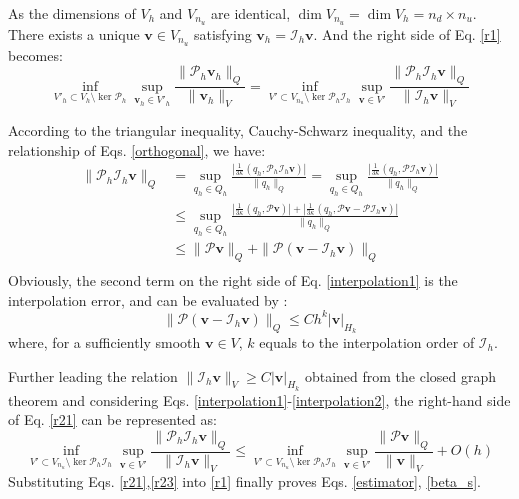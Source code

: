 \begin{pf}
As the dimensions of $V_h$ and $V_{n_u}$ are identical, $\dim V_{n_u} = \dim V_h = n_d \times n_u$. There exists a unique $\boldsymbol{v} \in V_{n_u}$ satisfying $\boldsymbol{v}_h = \mathcal{I}_h \boldsymbol{v}$. And the right side of Eq. \eqref{r1} becomes:
\begin{equation}\label{r21}
\inf_{V'_h \subset V_h \setminus \ker \mathcal{P}_h} \sup_{\boldsymbol{v}_h \in V'_h} \frac{\|\mathcal{P}_h \boldsymbol{v}_h\|_Q}{\|\boldsymbol{v}_h\|_V} = \inf_{V' \subset V_{n_u} \setminus \ker \mathcal{P}_h \mathcal{I}_h} \sup_{\boldsymbol{v} \in V'} \frac{\|\mathcal{P}_h \mathcal{I}_h \boldsymbol{v}\|_Q}{\|\mathcal{I}_h \boldsymbol{v}\|_V}
\end{equation}

According to the triangular inequality, Cauchy-Schwarz inequality, and the relationship of Eqs. \eqref{orthogonal}, we have:
\begin{equation}\label{interpolation1}
\begin{aligned}
\|\mathcal{P}_h \mathcal{I}_h \boldsymbol{v}\|_Q &= \sup_{q_h \in Q_h} \frac{|\frac{1}{3\kappa} (q_h, \mathcal{P}_h \mathcal{I}_h \boldsymbol{v})|}{\|q_h\|_Q} = \sup_{q_h \in Q_h} \frac{|\frac{1}{3\kappa}(q_h, \mathcal{P} \mathcal{I}_h \boldsymbol{v})|}{\|q_h\|_Q} \\
&\le \sup_{q_h \in Q_h} \frac{|\frac{1}{3\kappa}(q_h, \mathcal{P} \boldsymbol{v})| + |\frac{1}{3\kappa}(q_h, \mathcal{P} \boldsymbol{v} - \mathcal{P} \mathcal{I}_h \boldsymbol{v})|}{\|q_h\|_Q} \\
&\le \|\mathcal{P} \boldsymbol{v}\|_Q + \|\mathcal{P} (\boldsymbol{v} - \mathcal{I}_h \boldsymbol{v})\|_Q \\
\end{aligned}
\end{equation}
Obviously, the second term on the right side of Eq. \eqref{interpolation1} is the interpolation error, and can be evaluated by \cite{yosida1995}:
\begin{equation}
\label{interpolation2}
\|\mathcal{P} (\boldsymbol{v} - \mathcal{I}_h \boldsymbol{v})\|_Q \le Ch^{k} |\boldsymbol{v}|_{H_k}
\end{equation}
where, for a sufficiently smooth $\boldsymbol{v}\in V$, $k$ equals to the interpolation order of $\mathcal I_h$. 

Further leading the relation $\|\mathcal{I}_h \boldsymbol{v}\|_V \ge C |\boldsymbol{v}|_{H_k}$ obtained from the closed graph theorem \cite{quarteroni1994} and considering Eqs. \eqref{interpolation1}-\eqref{interpolation2}, the right-hand side of Eq. \eqref{r21} can be represented as:
\begin{equation}\label{r23}
\inf_{V' \subset V_{n_u} \setminus \ker \mathcal{P}_h \mathcal{I}_h} \sup_{\boldsymbol{v} \in V'} \frac{\|\mathcal{P}_h \mathcal{I}_h \boldsymbol{v}\|_Q}{\|\mathcal{I}_h \boldsymbol{v}\|_V} \le \inf_{V' \subset V_{n_u} \setminus \ker \mathcal{P}_h \mathcal{I}_h} \sup_{\boldsymbol{v} \in V'} \frac{\|\mathcal{P} \boldsymbol{v}\|_Q}{\|\boldsymbol{v}\|_V} + O(h)
\end{equation}
Substituting Eqs. \eqref{r21},\eqref{r23} into \eqref{r1} finally proves Eqs. \eqref{estimator}, \eqref{beta_s}.
\end{pf}

